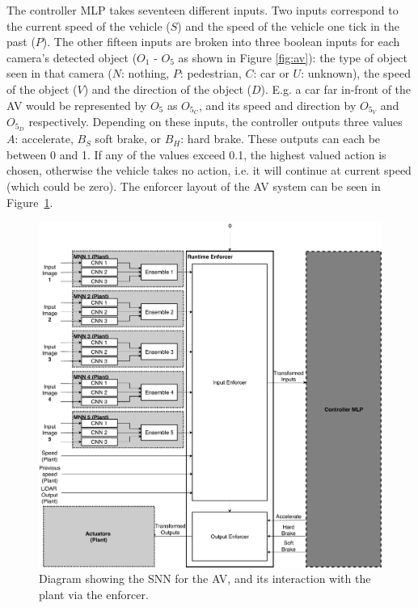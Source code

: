 The controller \ac{MLP} takes seventeen different inputs. 
Two inputs correspond to the current speed of the vehicle ($S$) and the speed of the vehicle one tick in the past ($P$). 
The other fifteen inputs are broken into three boolean inputs for each camera's detected object ($O_1$ - $O_5$ as shown in Figure \ref{fig:av}): the type of object seen in that camera ($N$: nothing, $P$: pedestrian, $C$: car or $U$: unknown), the speed of the object ($V$) and the direction of the object ($D$).
E.g. a car far in-front of the \ac{AV} would be represented by $O_5$ as $O_{5_C}$, and its speed and direction by $O_{5_V}$ and $O_{5_D}$ respectively.
Depending on these inputs, the controller outputs three values  $A$: accelerate, $B_S$ soft brake, or $B_H$: hard brake.
These outputs can each be between 0 and 1.
If any of the values exceed 0.1, the highest valued action is chosen, otherwise the vehicle takes no action, i.e. it will continue at current speed (which could be zero).
The enforcer layout of the \ac{AV} system can be seen in Figure~\ref{fig:avmnn}.

\begin{figure}[H]
	\centering
	\includegraphics[width=\textwidth]{Content/fig/AV-MNN.pdf}
	\caption{Diagram showing the \ac{SNN} for the \ac{AV}, and its interaction with the plant via the enforcer. \label{fig:avmnn}}
\end{figure}

